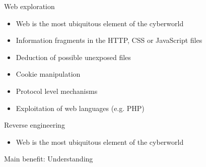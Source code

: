 \documentclass[12 pt]{beamer}
\begin{document}

\begin{frame}{Web exploration}

  \begin{itemize}
    \item{Web is the most ubiquitous element of the cyberworld}
    \item{Information fragments in the HTTP, CSS or JavaScript files}
    \item{Deduction of possible unexposed files}
    \item{Cookie manipulation}
    \item{Protocol level mechanisms}
    \item{Exploitation of web languages (e.g. PHP)}
  \end{itemize}

\end{frame}


\begin{frame}{Reverse engineering}

  \begin{itemize}
    \item{Web is the most ubiquitous element of the cyberworld}
  \end{itemize}

  \begin{exampleblock}{}
    Main benefit: Understanding 
  \end{exampleblock}

\end{frame}

\end{document}
